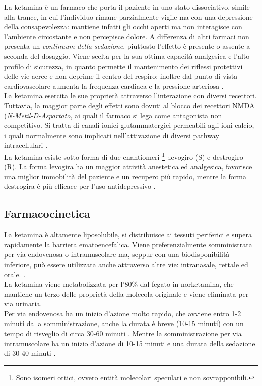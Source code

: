 La ketamina è un farmaco che porta il paziente in uno stato dissociativo, simile alla trance, in cui l'individuo rimane parzialmente vigile ma con una depressione della consapevolezza: mantiene infatti gli occhi aperti ma non interagisce con l'ambiente circostante e non percepisce dolore. A differenza di altri farmaci non presenta un \emph{continuum della sedazione}, piuttosto l'effetto è presente o assente a seconda del dosaggio. Viene scelta per la sua ottima capacità analgesica e l'alto profilo di sicurezza, in quanto permette il mantenimento dei riflessi protettivi delle vie aeree e non deprime il centro del respiro; inoltre dal punto di vista cardiovascolare aumenta la frequenza cardiaca e la pressione arteriosa \cite{Krauss2006}. 
\\La ketamina esercita le sue proprietà attraverso l'interazione con diversi recettori. Tuttavia, la maggior parte degli effetti sono dovuti al blocco dei recettori NMDA (\emph{N-Metil-D-Aspartato}, ai quali il farmaco si lega come antagonista non competitivo. Si tratta di canali ionici glutammatergici permeabili agli ioni calcio, i quali normalmente sono implicati nell'attivazione di diversi pathway intracellulari \cite{Zanos2018}.
\\La ketamina esiste sotto forma di due enantiomeri \footnote{Sono isomeri ottici, ovvero entità molecolari speculari e non sovrapponibili.} :levogiro (S) e destrogiro (R). La forma levogira ha un maggior attività anestetica ed analgesica, favorisce una miglior immobilità del paziente e un recupero più rapido, mentre la forma destrogira è più efficace per l'uso antidepressivo \cite{Simeupsedazione}.

\subsection*{Farmacocinetica}

La ketamina è altamente liposolubile, si distribuisce ai tessuti periferici e supera rapidamente la barriera ematoencefalica. Viene preferenzialmente somministrata per via endovenosa o intramuscolare ma, seppur con una biodisponibilità inferiore, può essere utilizzata anche attraverso altre vie: intranasale, rettale ed orale. \cite{Simeupsedazione, Ketamineapplication2019}. 
\\La ketamina viene metabolizzata per l'80\% dal fegato in norketamina, che mantiene un terzo delle proprietà della molecola originale e viene eliminata per via urinaria. 
\\Per via endovenosa ha un inizio d'azione molto rapido, che avviene entro 1-2 minuti dalla somministrazione, anche la durata è breve (10-15 minuti) con un tempo di risveglio di circa 30-60 minuti \cite{Uptodatepharmacology}. Mentre la somministrazione per via intramuscolare ha un inizio d'azione di 10-15 minuti e una durata della sedazione di 30-40 minuti \cite{Berkenbosch2015}.

